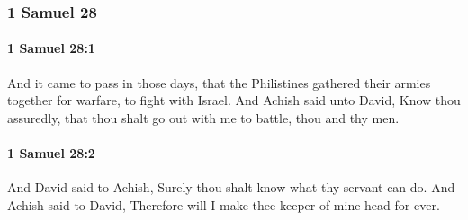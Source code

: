 	\subsubsection{1 Samuel 28} %
		\label{1SAMUEL-28}

		\paragraph{1 Samuel 28:1} %
			\label{1SAMUEL-28-1}

			And it came to pass in those days, that the Philistines gathered their armies together for warfare, to fight with Israel. And Achish said unto David, Know thou assuredly, that thou shalt go out with me to battle, thou and thy men.


		\paragraph{1 Samuel 28:2} %
			\label{1SAMUEL-28-2}

			And David said to Achish, Surely thou shalt know what thy servant can do. And Achish said to David, Therefore will I make thee keeper of mine head for ever.

